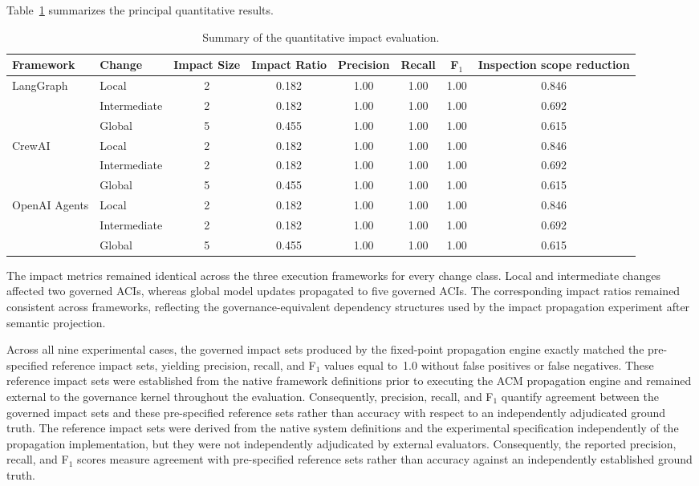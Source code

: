 \documentclass[10pt]{article}
\begin{document}
Table~\ref{tab:impact_summary} summarizes the principal quantitative results.

\begin{table}[t]
	\centering
	\caption{Summary of the quantitative impact evaluation.}
	\label{tab:impact_summary}
	\small
	\begin{tabular}{llcccccc}
		\toprule
		Framework &
		Change &
		Impact Size &
		Impact Ratio &
		Precision &
		Recall &
		F$_1$ &
		Inspection scope reduction
		\\
		\midrule
		LangGraph &
		Local &
		2 &
		0.182 &
		1.00 &
		1.00 &
		1.00 &
		0.846
		\\
		&
		Intermediate &
		2 &
		0.182 &
		1.00 &
		1.00 &
		1.00 &
		0.692
		\\
		&
		Global &
		5 &
		0.455 &
		1.00 &
		1.00 &
		1.00 &
		0.615
		\\
		\midrule
		CrewAI &
		Local &
		2 &
		0.182 &
		1.00 &
		1.00 &
		1.00 &
		0.846
		\\
		&
		Intermediate &
		2 &
		0.182 &
		1.00 &
		1.00 &
		1.00 &
		0.692
		\\
		&
		Global &
		5 &
		0.455 &
		1.00 &
		1.00 &
		1.00 &
		0.615
		\\
		\midrule
		OpenAI Agents &
		Local &
		2 &
		0.182 &
		1.00 &
		1.00 &
		1.00 &
		0.846
		\\
		&
		Intermediate &
		2 &
		0.182 &
		1.00 &
		1.00 &
		1.00 &
		0.692
		\\
		&
		Global &
		5 &
		0.455 &
		1.00 &
		1.00 &
		1.00 &
		0.615
		\\
		\bottomrule
	\end{tabular}
\end{table}

The impact metrics remained identical across the three execution frameworks for every change class. Local and intermediate changes affected two governed ACIs, whereas global model updates propagated to five governed ACIs. The corresponding impact ratios remained consistent across frameworks, reflecting the governance-equivalent dependency structures used by the impact propagation experiment after semantic projection. 

Across all nine experimental cases, the governed impact sets produced by the fixed-point propagation engine exactly matched the pre-specified reference impact sets, yielding precision, recall, and F$_1$ values equal to~1.0 without false positives or false negatives. 
These reference impact sets were established from the native framework definitions prior to executing the ACM propagation engine and remained external to the governance kernel throughout the evaluation. Consequently, precision, recall, and F$_1$ quantify agreement between the governed impact sets and these pre-specified reference sets rather than accuracy with respect to an independently adjudicated ground truth. 
The reference impact sets were derived from the native system definitions and
the experimental specification independently of the propagation implementation,
but they were not independently adjudicated by external evaluators. Consequently,
the reported precision, recall, and F$_1$ scores measure agreement with
pre-specified reference sets rather than accuracy against an independently
established ground truth.
\end{document}
